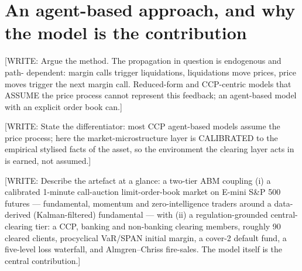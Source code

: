 \section{An agent-based approach, and why the model is the contribution}
\label{sec:intro-approach}

[WRITE: Argue the method. The propagation in question is endogenous and path-
dependent: margin calls trigger liquidations, liquidations move prices, price moves
trigger the next margin call. Reduced-form and CCP-centric models that ASSUME the
price process cannot represent this feedback; an agent-based model with an explicit
order book can.] \citep{bookstaber_2014,vytelingum_2025}

[WRITE: State the differentiator: most CCP agent-based models assume the price
process; here the market-microstructure layer is CALIBRATED to the empirical
stylised facts of the asset, so the environment the clearing layer acts in is
earned, not assumed.] \citep{gao_2022_xgb,majewski_2018,cont_2001}

[WRITE: Describe the artefact at a glance: a two-tier ABM coupling (i) a calibrated
1-minute call-auction limit-order-book market on E-mini S\&P 500 futures — fundamental,
momentum and zero-intelligence traders around a data-derived (Kalman-filtered)
fundamental — with (ii) a regulation-grounded central-clearing tier: a CCP, banking
and non-banking clearing members, roughly 90 cleared clients, procyclical VaR/SPAN initial
margin, a cover-2 default fund, a five-level loss waterfall, and Almgren--Chriss
fire-sales. The model itself is the central contribution.]
\citep{cont_stoikov_talreja_2008,farmer_2005,almgren_chriss_2000,simudyne_odd,deloitte_ccp}

